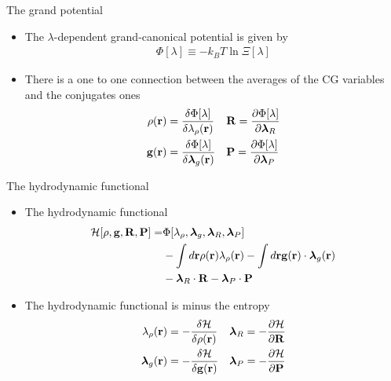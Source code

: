 \documentclass{beamer}
\begin{document}
\begin{frame}{The grand potential}
  \begin{itemize}
\item The $\lambda$-dependent grand-canonical potential is given by
\begin{eqnarray}
  \Phi [\lambda]\equiv-k_BT \ln\Xi [\lambda]
\nonumber
\end{eqnarray}

\item There is a one to one connection between the averages of the CG variables and the conjugates ones
\begin{align}
  \rho({\bf r}) &=\frac{\delta \Phi [\lambda]}{\delta \lambda_\rho({\bf r}) }
&&{\bf R} =\frac{\partial \Phi [\lambda]}{\partial \boldsymbol{\lambda}_R }
\nonumber\\
  {\bf g}({\bf r}) &=\frac{\delta \Phi [\lambda]}{\delta \boldsymbol{\lambda}_g({\bf r}) }
&&{\bf P} =\frac{\partial \Phi [\lambda]}{\partial \boldsymbol{\lambda}_P }
\nonumber
\end{align}
\end{itemize}
\end{frame}

\begin{frame}{The hydrodynamic functional}
  \begin{itemize}
\item The hydrodynamic functional 
\begin{align}
    {\cal H}[\rho,{\bf g},{\bf R},{\bf P}] =&
\Phi [\lambda_\rho,\boldsymbol{\lambda}_g,\boldsymbol{\lambda}_R,\boldsymbol{\lambda}_P]
\nonumber\\
    & -
\int d{\bf r}\rho({\bf r})\lambda_\rho({\bf r})
-
\int d{\bf r}{\bf g}({\bf r})\cdot\boldsymbol{\lambda}_g({\bf r})
\nonumber\\
    &    -\boldsymbol{\lambda}_R\cdot{\bf R}-\boldsymbol{\lambda}_P\cdot{\bf P}
\nonumber
\end{align}
\item The hydrodynamic functional is minus the entropy 
\begin{align}
  \lambda_\rho({\bf r}) &=-\frac{\delta {\cal H}}{\delta \rho({\bf r}) }
&&  \boldsymbol{\lambda}_R =-\frac{\partial {\cal H}}{\partial {\bf R} }
\nonumber\\
  \boldsymbol{\lambda}_g({\bf r}) &=-\frac{\delta {\cal H}}{\delta {\bf g}({\bf r}) }
&&  \boldsymbol{\lambda}_P =-\frac{\partial {\cal H}}{\partial{\bf P} }
\nonumber
\end{align}
\end{itemize}
\end{frame}
\end{document}
